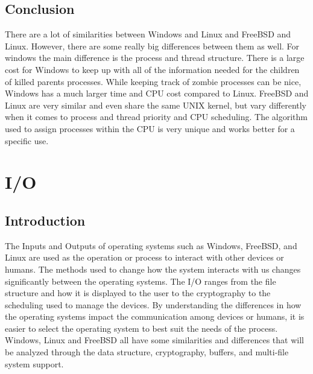 \documentclass[draftclsnofoot, onecolumn, compsoc, 10pt]{IEEEtran}
\begin{document}
\subsection{Conclusion}

There are a lot of similarities between Windows and Linux and FreeBSD and Linux. However, there are some really big differences between them as well. For windows the main difference is the process and thread structure. There is a large cost for Windows to keep up with all of the information needed for the children of killed parents processes. While keeping track of zombie processes can be nice, Windows has a much larger time and CPU cost compared to Linux. FreeBSD and Linux are very similar and even share the same UNIX kernel, but vary differently when it comes to process and thread priority and CPU scheduling. The algorithm used to assign processes within the CPU is very unique and works better for a specific use. 

\section{I/O}
\subsection{Introduction}
The Inputs and Outputs of operating systems such as Windows, FreeBSD, and Linux are used as the operation or process to interact with other devices or humans. The methods used to change how the system interacts with us changes significantly between the operating systems. The I/O ranges from the file structure and how it is displayed to the user to the cryptography to the scheduling used to manage the devices. By understanding the differences in how the operating systems impact the communication among devices or humans, it is easier to select the operating system to best suit the needs of the process. Windows, Linux and FreeBSD all have some similarities and differences that will be analyzed through the data structure, cryptography, buffers, and multi-file system support. 
\end{document}
